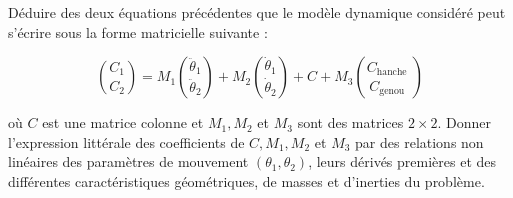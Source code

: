 \begin{question}%
\label{2023_ccs_psi_q_11}
Déduire des deux équations précédentes que le modèle dynamique considéré peut s'écrire sous la forme matricielle suivante :

$$
\binom{C_{1}}{C_{2}}=M_{1}\binom{\ddot{\theta}_{1}}{\ddot{\theta}_{2}}+M_{2}\binom{\dot{\theta}_{1}}{\dot{\theta}_{2}}+C+M_{3}\binom{C_{\text {hanche }}}{C_{\text {genou }}}
$$

où $C$ est une matrice colonne et $M_{1}, M_{2}$ et $M_{3}$ sont des matrices $2 \times 2$. Donner l'expression littérale des coefficients de $C, M_{1}, M_{2}$ et $M_{3}$ par des relations non linéaires des paramètres de mouvement $\left(\theta_{1}, \theta_{2}\right)$, leurs dérivés premières et des différentes caractéristiques géométriques, de masses et d'inerties du problème.
\end{question}
\ifprof
